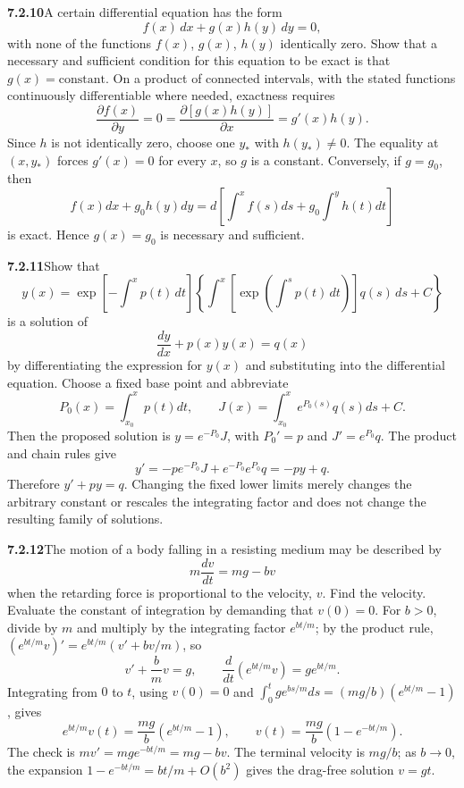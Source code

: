 \par\bigskip
\noindent\textbf{7.2.10}\quad A certain differential equation has the form
\[
f(x)\,dx+g(x)h(y)\,dy=0,
\]
with none of the functions $f(x)$, $g(x)$, $h(y)$ identically zero. Show that
a necessary and sufficient condition for this equation to be exact is that
$g(x)=\text{constant}$.
\solution
On a product of connected intervals, with the stated functions continuously
differentiable where needed, exactness requires
\[
\frac{\partial f(x)}{\partial y}=0
=\frac{\partial[g(x)h(y)]}{\partial x}=g'(x)h(y).
\]
Since $h$ is not identically zero, choose one $y_*$ with $h(y_*)\ne0$.
The equality at $(x,y_*)$ forces $g'(x)=0$ for every $x$, so $g$ is a
constant. Conversely, if $g=g_0$, then
\[
f(x)dx+g_0h(y)dy=d\left[\int^xf(s)ds+g_0\int^yh(t)dt\right]
\]
is exact. Hence $\boxed{g(x)=g_0}$ is necessary and sufficient.

\par\bigskip
\noindent\textbf{7.2.11}\quad Show that
\[
y(x)=\exp\left[-\int^{x}p(t)\,dt\right]
\left\{\int^{x}\left[\exp\left(\int^{s}p(t)\,dt\right)\right]q(s)\,ds
+C\right\}
\]
is a solution of
\[
\frac{dy}{dx}+p(x)y(x)=q(x)
\]
by differentiating the expression for $y(x)$ and substituting into the
differential equation.
\solution
Choose a fixed base point and abbreviate
\[
P_0(x)=\int_{x_0}^xp(t)dt,\qquad
J(x)=\int_{x_0}^xe^{P_0(s)}q(s)ds+C.
\]
Then the proposed solution is $y=e^{-P_0}J$, with
$P_0'=p$ and $J'=e^{P_0}q$. The product and chain rules give
\[
y'=-p e^{-P_0}J+e^{-P_0}e^{P_0}q=-py+q.
\]
Therefore $\boxed{y'+py=q}$. Changing the fixed lower limits merely
changes the arbitrary constant or rescales the integrating factor and
does not change the resulting family of solutions.

\par\bigskip
\noindent\textbf{7.2.12}\quad The motion of a body falling in a resisting
medium may be described by
\[
m\frac{dv}{dt}=mg-bv
\]
when the retarding force is proportional to the velocity, $v$. Find the
velocity. Evaluate the constant of integration by demanding that $v(0)=0$.
\solution
For $b>0$, divide by $m$ and multiply by the integrating factor
$e^{bt/m}$; by the product rule,
$(e^{bt/m}v)'=e^{bt/m}(v'+bv/m)$, so
\[
v'+\frac bm v=g,\qquad
\frac d{dt}(e^{bt/m}v)=ge^{bt/m}.
\]
Integrating from $0$ to $t$, using $v(0)=0$ and
$\int_0^tge^{bs/m}ds=(mg/b)(e^{bt/m}-1)$, gives
\[
e^{bt/m}v(t)=\frac{mg}{b}(e^{bt/m}-1),\qquad
\boxed{v(t)=\frac{mg}{b}(1-e^{-bt/m})}.
\]
The check is $mv'=mg e^{-bt/m}=mg-bv$.
The terminal velocity is $mg/b$; as $b\to0$, the expansion
$1-e^{-bt/m}=bt/m+O(b^2)$ gives the drag-free solution $v=gt$.

